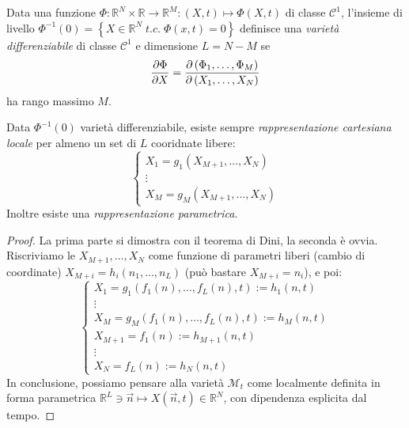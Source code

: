 \begin{definition}
    Data una funzione $\Phi: \mathbb{R}^N \times \mathbb{R}\rightarrow \mathbb{R}^M:(X,t)\mapsto \Phi(X,t)$ di classe $\mathcal{C}^1$,
    l'insieme di livello $\Phi^{-1}(0)= \left\{ X\in \mathbb{R}^N \;t.c.\; \Phi(x,t)=0\right\}$ definisce una \textit{varietà differenziabile}
    di classe $\mathcal{C}^1$ e dimensione $L=N-M $ se 
    \begin{equation}
        \pdv{\Phi}{X}= \pdv{\left( \Phi_1,\dots,\Phi_M \right)}{\left( X_1,\dots, X_N \right)}
    \end{equation} ha rango massimo $M $.
\end{definition}
\begin{theorem}
    Data $\Phi^{-1}(0) $ varietà differenziabile, esiste sempre \textit{rappresentazione cartesiana locale} per almeno un set di $L $ cooridnate libere:
    \begin{equation}
        \begin{cases}
            X_1 = g_1(X_{M+1},\dots,X_N)\\\vdots\\X_M = g_M (X_{M+1},\dots, X_N )
        \end{cases}
    \end{equation}
    Inoltre esiste una \textit{rappresentazione parametrica}.
\end{theorem}
\begin{proof}
    La prima parte si dimostra con il teorema di Dini, la seconda è ovvia. Riscriviamo le \( X_{M+1}, \dots, X_N \) come funzione di parametri liberi (cambio di coordinate) \( X_{M+i} = h_i(n_1, \dots, n_L) \) (può bastare \( X_{M+i} = n_i \)), e poi:
    \begin{equation*}
        \begin{cases}
            X_1 = g_1(f_1(n), \dots, f_L(n), t) := h_1(n, t)\\
            \vdots\\
            X_M = g_M(f_1(n), \dots, f_L(n), t) := h_M(n, t)\\
            X_{M+1} = f_1(n) := h_{M+1}(n, t)\\
            \vdots\\
            X_N = f_L(n) := h_N(n, t)
        \end{cases}
    \end{equation*}
    In conclusione, possiamo pensare alla varietà \(\mathcal{M}_t\) come localmente definita in forma parametrica \( \mathbb{R}^L \ni \vec{n} \mapsto X(\vec{n}, t) \in \mathbb{R}^N \), con dipendenza esplicita dal tempo.
\end{proof}

